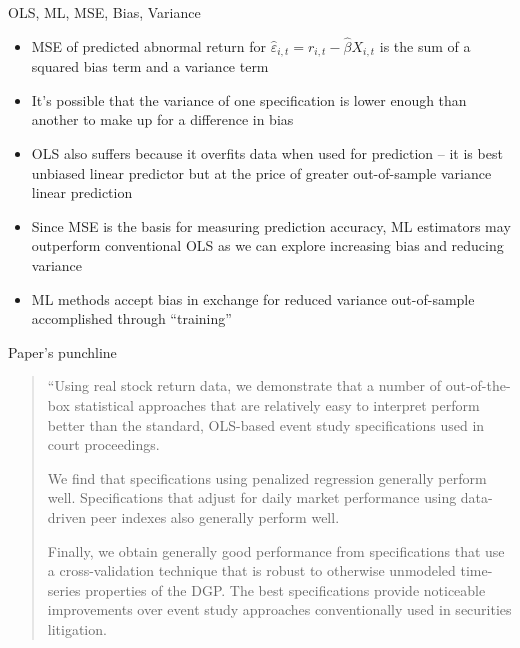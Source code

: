 \documentclass{beamer}
\begin{document}
\begin{frame}{OLS, ML, MSE, Bias, Variance}

\begin{itemize}
\item MSE of predicted abnormal return for $\widehat{\varepsilon}_{i,t} = r_{i,t} - \widehat{\beta}X_{i,t}$ is the sum of a squared bias term and a variance term
\item It's possible that the variance of one specification is lower enough than another to make up for a difference in bias
\item OLS also suffers because it overfits data when used for prediction -- it is best unbiased linear predictor but at the price of greater out-of-sample variance linear prediction
\item Since MSE is the basis for measuring prediction accuracy, ML estimators may outperform conventional OLS as we can explore increasing bias and reducing variance
\item ML methods accept bias in exchange for reduced variance out-of-sample accomplished through ``training''
\end{itemize}

\end{frame}

\begin{frame}{Paper's punchline}

\begin{quote}
``Using real stock return data, we demonstrate that a number of out-of-the-box statistical approaches that are relatively easy to interpret perform better than the standard, OLS-based event study specifications used in court proceedings.

\bigskip

We find that specifications using penalized regression generally perform well.  Specifications that adjust for daily market performance using data-driven peer indexes also generally perform well.

\bigskip

Finally, we obtain generally good performance from specifications that use a cross-validation technique that is robust to otherwise unmodeled time-series properties of the DGP. The best specifications provide noticeable improvements over event study approaches conventionally used in securities litigation. 

\end{quote}

\end{frame}
\end{document}
